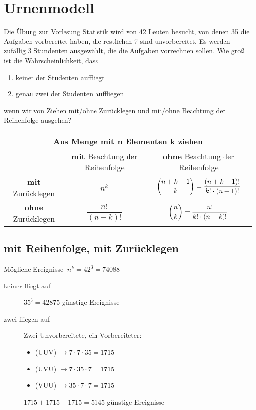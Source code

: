 \documentclass[11pt, a4paper]{article}
\begin{document}
\newpage
\section{Urnenmodell}
Die Übung zur Vorlesung Statistik wird von 42 Leuten besucht, von denen 35 die Aufgaben vorbereitet haben, die restlichen 7 sind unvorbereitet. Es werden zufällig 3 Stundenten ausgewählt, die die Aufgaben vorrechnen sollen. Wie groß ist die Wahrscheinlichkeit, dass
\begin{enumerate}
	\item keiner der Studenten auffliegt
	\item genau zwei der Studenten auffliegen
\end{enumerate}
wenn wir von Ziehen mit/ohne Zurücklegen und mit/ohne Beachtung der Reihenfolge ausgehen?

\vspace{\baselineskip}
\begin{tabular}{|c||c|c|}
	\hline
	\multicolumn{3}{|c|}{Aus Menge mit \textbf{n} Elementen \textbf{k} ziehen} \\
	\hline
	 & \textbf{mit} Beachtung der Reihenfolge & \textbf{ohne} Beachtung der Reihenfolge \\
	\hline \hline
	\textbf{mit} Zurücklegen & $n^k$ & $\dbinom{n+k-1}{k} = \dfrac{(n+k-1)!}{k!\cdot (n-1)!}$ \\
	\hline
	\textbf{ohne} Zurücklegen & $\dfrac{n!}{(n-k)!}$ & $\dbinom{n}{k} = \dfrac{n!}{k!\cdot (n-k)!}$ \\
\hline
\end{tabular}

\subsection{mit Reihenfolge, mit Zurücklegen}
Mögliche Ereignisse: $n^k = 42^3 = 74088$
\begin{description}
	\item[keiner fliegt auf] $35^3 = 42875$  günstige Ereignisse
	\item[zwei fliegen auf] Zwei Unvorbereitete, ein Vorbereiteter:
		\begin{itemize}
			\item (UUV) $\rightarrow 7 \cdot 7 \cdot 35 = 1715$
			\item (UVU) $\rightarrow 7 \cdot 35 \cdot 7 = 1715$
			\item (VUU) $\rightarrow 35 \cdot 7 \cdot 7 = 1715$
		\end{itemize}
		$1715 + 1715 + 1715 = 5145$ günstige Ereignisse
\end{description}
\end{document}
